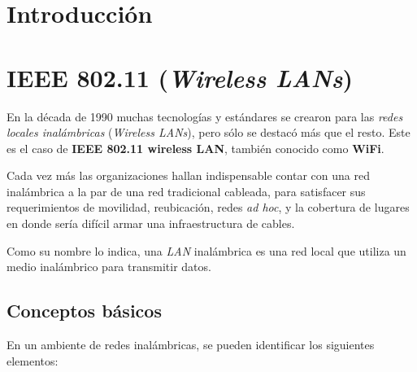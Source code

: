 





\tableofcontents
\clearpage 

\section{Introducción}


\section{IEEE 802.11 (\emph{Wireless LANs})}

En la década de 1990 muchas tecnologías y estándares se crearon para las \emph{redes locales inalámbricas} (\emph{Wireless LANs}), pero sólo se destacó más que el resto. Este es el caso de \textbf{IEEE 802.11 wireless LAN}, también conocido como \textbf{WiFi}.  

Cada vez más las organizaciones hallan indispensable contar con una red inalámbrica a la par de una red tradicional cableada, para satisfacer sus requerimientos de movilidad, reubicación, redes \emph{ad hoc}, y la cobertura de lugares en donde sería difícil armar una infraestructura de cables.

Como su nombre lo indica, una \emph{LAN} inalámbrica es una red local que utiliza un medio inalámbrico para transmitir datos. 

\subsection{Conceptos básicos}

En un ambiente de redes inalámbricas, se pueden identificar los siguientes elementos:

